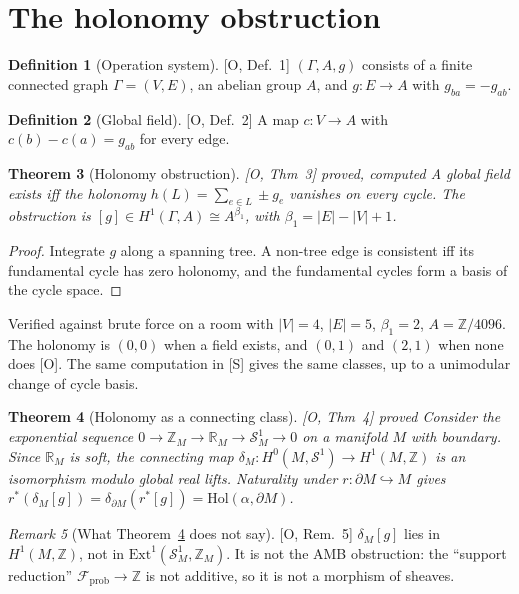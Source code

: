\documentclass[11pt]{article}
\newtheorem{theorem}{Theorem}[section]
\theoremstyle{definition}
\newtheorem{definition}[theorem]{Definition}
\theoremstyle{remark}
\newtheorem{remark}[theorem]{Remark}
\newcommand{\Z}{\mathbb{Z}}
\newcommand{\R}{\mathbb{R}}
\newcommand{\src}[1]{\textsf{\small[#1]}}
\newcommand{\st}[1]{\textsf{\small\color{gray}#1}}
\begin{document}
\section{The holonomy obstruction}
\begin{definition}[Operation system]\src{O, Def.~1}
$(\Gamma,A,g)$ consists of a finite connected graph $\Gamma=(V,E)$, an abelian group $A$, and $g:E\to A$ with $g_{ba}=-g_{ab}$.
\end{definition}
\begin{definition}[Global field]\src{O, Def.~2} A map $c:V\to A$ with $c(b)-c(a)=g_{ab}$ for every edge.\end{definition}
\begin{theorem}[Holonomy obstruction]\label{thm:hol}
\src{O, Thm~3} \st{proved, computed}
A global field exists iff the holonomy $h(L)=\sum_{e\in L}\pm g_e$ vanishes on every cycle. The obstruction is $[g]\in H^1(\Gamma,A)\cong A^{\beta_1}$, with $\beta_1=|E|-|V|+1$.
\end{theorem}
\begin{proof}
Integrate $g$ along a spanning tree. A non-tree edge is consistent iff its fundamental cycle has zero holonomy, and the fundamental cycles form a basis of the cycle space.
\end{proof}
\noindent Verified against brute force on a room with $|V|=4$, $|E|=5$, $\beta_1=2$, $A=\Z/4096$. The holonomy is $(0,0)$ when a field exists, and $(0,1)$ and $(2,1)$ when none does \src{O}. The same computation in \src{S} gives the same classes, up to a unimodular change of cycle basis.

\begin{theorem}[Holonomy as a connecting class]\label{thm:smooth}
\src{O, Thm~4} \st{proved}
Consider the exponential sequence $0\to\Z_M\to\R_M\to\mathcal S^1_M\to0$ on a manifold $M$ with boundary. Since $\R_M$ is soft, the connecting map $\delta_M:H^0(M,\mathcal S^1)\to H^1(M,\Z)$ is an isomorphism modulo global real lifts. Naturality under $r:\partial M\hookrightarrow M$ gives $r^*(\delta_M[g])=\delta_{\partial M}(r^*[g])=\mathrm{Hol}(\alpha,\partial M)$.
\end{theorem}
\begin{remark}[What Theorem~\ref{thm:smooth} does not say]
\src{O, Rem.~5}
$\delta_M[g]$ lies in $H^1(M,\Z)$, not in $\mathrm{Ext}^1(\mathcal S^1_M,\Z_M)$. It is not the AMB obstruction: the ``support reduction'' $\mathcal F_{\text{prob}}\to\Z$ is not additive, so it is not a morphism of sheaves.
\end{remark}
\end{document}
